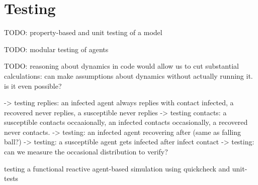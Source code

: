 \section{Testing}

TODO: property-based and unit testing of a model

TODO: modular testing of agents

TODO: reasoning about dynamics in code would allow us to cut substantial calculations: can make assumptions about dynamics without actually running it. is it even possible?

\cite{perez_testing_2017}

-> testing replies: an infected agent always replies with contact infected, a recovered never replies, a susceptible never replies
-> testing contacts: a susceptible contacts occaaionally, an infected contacts occasionally, a recovered never contacts.
-> testing: an infected agent recovering after (same as falling ball?)
-> testing: a susceptible agent gets infected after infect contact
-> testing: can we measure the occasional distribution to verify?

testing a functional reactive agent-based simulation using quickcheck and unit-tests